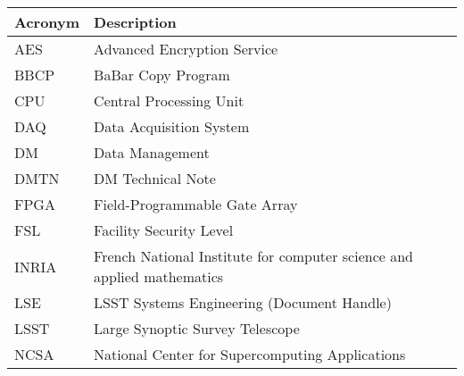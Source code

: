 \addtocounter{table}{-1}
\begin{longtable}{|l|p{}|}\hline
\textbf{Acronym} & \textbf{Description}  \\\hline

AES & Advanced Encryption Service \\\hline
BBCP & BaBar Copy Program \\\hline
CPU & Central Processing Unit \\\hline
DAQ & Data Acquisition System \\\hline
DM & Data Management \\\hline
DMTN & DM Technical Note \\\hline
FPGA & Field-Programmable Gate Array \\\hline
FSL & Facility Security Level \\\hline
INRIA & French National Institute for computer science and applied mathematics \\\hline
LSE & LSST Systems Engineering (Document Handle) \\\hline
LSST & Large Synoptic Survey Telescope \\\hline
NCSA & National Center for Supercomputing Applications \\\hline
\end{longtable}
